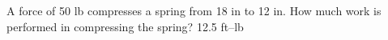 {A force of 50 lb compresses a spring from 18 in to 12 in. How much work is performed in compressing the spring?}
{12.5 ft--lb}

